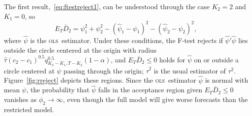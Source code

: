 \documentclass[11pt]{article}
\newcommand{\ols}{\textsc{ols}}
\begin{document}
The first result,~\eqref{eq:ftestreject1}, can be understood through the case $K_2 = 2$ and
$K_1 = 0$, so
\begin{equation*}
  E_T \bar D_2 = \psi_1^2 + \psi_2^2 - (\hat{\psi}_1 - \psi_1)^2 - (\hat\psi_2 - \psi_2)^2,
\end{equation*}
where $\hat{\psi}$ is the \ols\ estimator.  Under these conditions,
the F-test rejects if $\hat{\psi}'\hat{\psi}$ lies outside the circle
centered at the origin with radius $\hat{\tau} (c_2 - c_1)^{0.5}
q_{K_2-K_1, T-K_2}^{0.5}(1-\alpha)$, and $E_T \bar{D}_2 \leq 0$ holds
for $\hat\psi$ on or outside a circle centered at $\psi$ passing
through the origin; $\hat{\tau}^2$ is the usual estimator of $\tau^2$.
Figure~\ref{fig:rreject} depicts these regions.  Since the \ols\
estimator $\hat\psi$ is normal with mean $\psi$, the probability that
$\hat{\psi}$ falls in the acceptance region given $E_T \bar{D}_2 \leq
0$ vanishes as $\phi_2 \to \infty$, even though the full model will
give worse forecasts than the restricted model.

\newcommand{\circlefigA}[4]{
  \begin{tikzpicture}
    \fill[lightgray] (-#3,-#3) rectangle (#4,#4);
    \filldraw[fill=white,draw=black] (0,0) circle (#1);
    \filldraw[fill=white,draw=black] (1,1) let \p1=(1,1) in circle({veclen(\x1,\y1)});
    \draw (1,1) let \p1=(1,1) in circle({veclen(\x1,\y1)});
    \fill [black] (1,1) circle (2pt) node[right] {$(\psi_1,\psi_2)$};
    \draw (0,0) circle (#1);
    \draw (1,1)--(0,0);
    \draw[->] (0,0)--(#2,0) node[right] {$\hat\psi_1$};
    \draw[->] (0,0)--(0,#2) node[above] {$\hat\psi_2$};
  \end{tikzpicture}
}
\newcommand{\circlefigB}[4]{
  \begin{tikzpicture}
    \fill[white] (-#3,-#3) rectangle (#4,#4);
    \fill[lightgray] (0,0) circle (#1);
    \fill[white] (1,1) let \p1=(1,1) in circle({veclen(\x1,\y1)});
    \draw (0,0) circle (#1);
    \draw (1,1) let \p1=(1,1) in circle({veclen(\x1,\y1)});
    \fill [black] (1,1) circle (2pt) node[right] {$(\psi_1,\psi_2)$};
    \draw (1,1)--(0,0);
    \draw[->] (0,0)--(#2,0) node[right] {$\hat\psi_1$};
    \draw[->] (0,0)--(0,#2) node[above] {$\hat\psi_2$};
  \end{tikzpicture}
}
\end{document}
